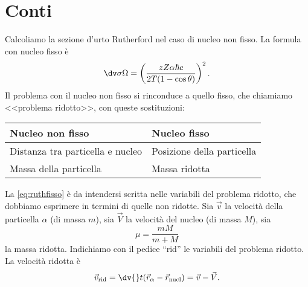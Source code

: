 \appendix
\section{Conti}

Calcoliamo la sezione d'urto Rutherford nel caso di nucleo non fisso.
La formula con nucleo fisso è
\begin{equation}
	\label{eq:ruthfisso}
	\dv\sigma\Omega = \left( \frac {zZ\alpha\hbar c} {2T(1-\cos\theta)} \right)^2.
\end{equation}
Il problema con il nucleo non fisso si rinconduce a quello fisso,
che chiamiamo <<problema ridotto>>, con queste sostituzioni:
\begin{center}
	\begin{tabular}{ll}
		Nucleo non fisso                 & Nucleo fisso               \\
		\hline
		Distanza tra particella e nucleo & Posizione della particella \\
		Massa della particella           & Massa ridotta              
	\end{tabular}
\end{center}
La \eqref{eq:ruthfisso} è da intendersi scritta nelle variabili del problema ridotto,
che dobbiamo esprimere in termini di quelle non ridotte.
Sia $\vec v$ la velocità della particella $\alpha$ (di massa $m$),
sia $\vec V$ la velocità del nucleo (di massa $M$), sia
\begin{equation*}
	\mu = \frac{mM}{m + M}
\end{equation*}
la massa ridotta.
Indichiamo con il pedice ``rid'' le variabili del problema ridotto.
La velocità ridotta è
\begin{equation*}
	\vec v_\text{rid} = \dv{}t(\vec r_\alpha - \vec r_\text{nucl}) = \vec v - \vec V.
\end{equation*}
